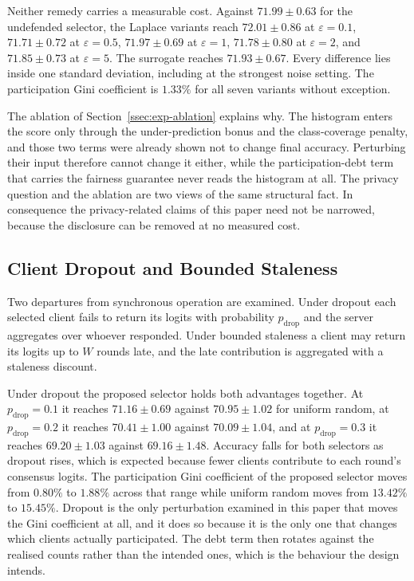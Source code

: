 \documentclass[journal]{IEEEtran}
\begin{document}
{Neither remedy carries a measurable cost. Against $71.99 \pm 0.63$ for the undefended selector, the Laplace variants reach $72.01 \pm 0.86$ at $\varepsilon = 0.1$, $71.71 \pm 0.72$ at $\varepsilon = 0.5$, $71.97 \pm 0.69$ at $\varepsilon = 1$, $71.78 \pm 0.80$ at $\varepsilon = 2$, and $71.85 \pm 0.73$ at $\varepsilon = 5$. The surrogate reaches $71.93 \pm 0.67$. Every difference lies inside one standard deviation, including at the strongest noise setting. The participation Gini coefficient is $1.33\%$ for all seven variants without exception.

The ablation of Section~\ref{ssec:exp-ablation} explains why. The histogram enters the score only through the under-prediction bonus and the class-coverage penalty, and those two terms were already shown not to change final accuracy. Perturbing their input therefore cannot change it either, while the participation-debt term that carries the fairness guarantee never reads the histogram at all. The privacy question and the ablation are two views of the same structural fact. In consequence the privacy-related claims of this paper need not be narrowed, because the disclosure can be removed at no measured cost.

\subsection{Client Dropout and Bounded Staleness}
\label{ssec:exp-dropout}

Two departures from synchronous operation are examined. Under dropout each selected client fails to return its logits with probability $p_{\text{drop}}$ and the server aggregates over whoever responded. Under bounded staleness a client may return its logits up to $W$ rounds late, and the late contribution is aggregated with a staleness discount.

Under dropout the proposed selector holds both advantages together. At $p_{\text{drop}} = 0.1$ it reaches $71.16 \pm 0.69$ against $70.95 \pm 1.02$ for uniform random, at $p_{\text{drop}} = 0.2$ it reaches $70.41 \pm 1.00$ against $70.09 \pm 1.04$, and at $p_{\text{drop}} = 0.3$ it reaches $69.20 \pm 1.03$ against $69.16 \pm 1.48$. Accuracy falls for both selectors as dropout rises, which is expected because fewer clients contribute to each round's consensus logits. The participation Gini coefficient of the proposed selector moves from $0.80\%$ to $1.88\%$ across that range while uniform random moves from $13.42\%$ to $15.45\%$. Dropout is the only perturbation examined in this paper that moves the Gini coefficient at all, and it does so because it is the only one that changes which clients actually participated. The debt term then rotates against the realised counts rather than the intended ones, which is the behaviour the design intends.

}
\end{document}
